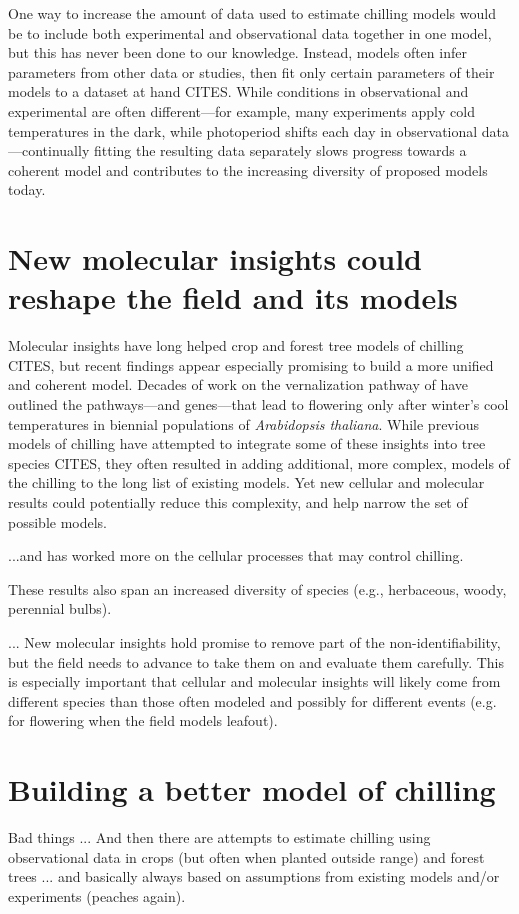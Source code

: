 \documentclass[11pt]{article}
\begin{document}
One way to increase the amount of data used to estimate chilling models would be to include both experimental and observational data together in one model, but this has never been done to our knowledge. Instead, models often infer parameters from other data or studies, then fit only certain parameters of their models to a dataset at hand CITES. While conditions in observational and experimental are often different---for example, many experiments apply cold temperatures in the dark, while photoperiod shifts each day in observational data---continually fitting the resulting data separately slows progress towards a coherent model and contributes to the increasing diversity of proposed models today. 

\section*{New molecular insights could reshape the field and its models} %

Molecular insights have long helped crop and forest tree models of chilling CITES, but recent findings appear especially promising to build a more unified and coherent model. Decades of work on the vernalization pathway of  have outlined the pathways---and genes---that lead to flowering only after winter's cool temperatures in biennial populations of \emph{Arabidopsis thaliana}. While previous models of chilling have attempted to integrate some of these insights into tree species CITES, they often resulted in adding additional, more complex, models of the chilling to the long list of existing models. Yet new cellular and molecular results could potentially reduce this complexity, and help narrow the set of possible models. 


...and has worked more on the cellular processes that may control chilling. 

These results also span an increased diversity of species (e.g., herbaceous, woody, perennial bulbs). 

... New molecular insights hold promise to remove part of the non-identifiability, but the field needs to advance to take them on and evaluate them carefully. This is especially important that cellular and molecular insights will likely come from different species than those often modeled and possibly for different events (e.g. for flowering when the field models leafout). 

\section*{Building a better model of chilling} 

Bad things ...
And then there are attempts to estimate chilling using observational data in crops (but often when planted outside range) and forest trees ... and basically always based on assumptions from existing models and/or experiments (peaches again).
\end{document}
